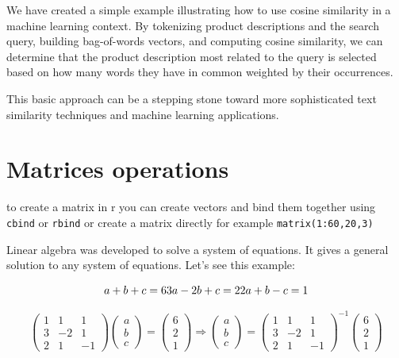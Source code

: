\documentclass[
  letterpaper,
  DIV=11,
  numbers=noendperiod]{scrartcl}
\begin{document}
We have created a simple example illustrating how to use cosine
similarity in a machine learning context. By tokenizing product
descriptions and the search query, building bag-of-words vectors, and
computing cosine similarity, we can determine that the product
description most related to the query is selected based on how many
words they have in common weighted by their occurrences.

This basic approach can be a stepping stone toward more sophisticated
text similarity techniques and machine learning applications.

\section{Matrices operations}\label{matrices-operations}

to create a matrix in r you can create vectors and bind them together
using \texttt{cbind} or \texttt{rbind} or create a matrix directly for
example \texttt{matrix(1:60,20,3)}

Linear algebra was developed to solve a system of equations. It gives a
general solution to any system of equations. Let's see this example:

\[
a + b + c = 6 \\
3a - 2b + c = 2 \\
2a + b - c = 1
\]

\[
\begin{pmatrix}
1 & 1 & 1 \\
3 & -2 & 1 \\
2 & 1 & -1
\end{pmatrix}
\begin{pmatrix}
a \\
b \\
c 
\end{pmatrix}
=
\begin{pmatrix}
6 \\
2 \\
1 
\end{pmatrix}
\Rightarrow
\begin{pmatrix}
a \\
b \\
c 
\end{pmatrix}
=
{\begin{pmatrix}
1 & 1 & 1 \\
3 & -2 & 1 \\
2 & 1 & -1
\end{pmatrix}}^{-1}
\begin{pmatrix}
6 \\
2 \\
1 
\end{pmatrix}
\]
\end{document}
